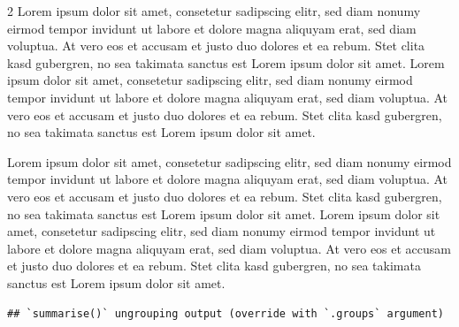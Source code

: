 \documentclass[
  a4paper,
  twoside]{article}
\begin{document}
\begin {multicols}{2}
Lorem ipsum dolor sit amet, consetetur sadipscing elitr, sed diam nonumy eirmod tempor invidunt ut labore et dolore magna aliquyam erat, sed diam voluptua. At vero eos et accusam et justo duo dolores et ea rebum. Stet clita kasd gubergren, no sea takimata sanctus est Lorem ipsum dolor sit amet. Lorem ipsum dolor sit amet, consetetur sadipscing elitr, sed diam nonumy eirmod tempor invidunt ut labore et dolore magna aliquyam erat, sed diam voluptua. At vero eos et accusam et justo duo dolores et ea rebum. Stet clita kasd gubergren, no sea takimata sanctus est Lorem ipsum dolor sit amet.

\end {multicols}

Lorem ipsum dolor sit amet, consetetur sadipscing elitr, sed diam nonumy eirmod tempor invidunt ut labore et dolore magna aliquyam erat, sed diam voluptua. At vero eos et accusam et justo duo dolores et ea rebum. Stet clita kasd gubergren, no sea takimata sanctus est Lorem ipsum dolor sit amet. Lorem ipsum dolor sit amet, consetetur sadipscing elitr, sed diam nonumy eirmod tempor invidunt ut labore et dolore magna aliquyam erat, sed diam voluptua. At vero eos et accusam et justo duo dolores et ea rebum. Stet clita kasd gubergren, no sea takimata sanctus est Lorem ipsum dolor sit amet.

\begin{verbatim}
## `summarise()` ungrouping output (override with `.groups` argument)
\end{verbatim}

\begin{table}[H]
\centering
{}
\end{table}
\end{document}
